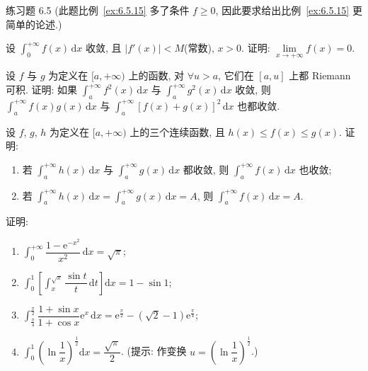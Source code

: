 \begin{exblock}{练习题 6.5}
  (此题比例~\ref{ex:6.5.15} 多了条件 $f\geqslant0$, 因此要求给出比例~\ref{ex:6.5.15} 更简单的论述.)

  \item 设 $\int_{0}^{+\infty}f(x)\,\mathrm{d}x$ 收敛, 且 $\left|f'(x)\right|<M$(常数), $x>0$. 证明: $\lim\limits_{x\to+\infty}f(x)=0$.

  \item 设 $f$ 与 $g$ 为定义在 $[a,+\infty)$ 上的函数, 对 $\forall u>a$, 它们在 $[a,u]$ 上都 Riemann 可积. 证明: 如果 $\int_{a}^{+\infty}f^{2}(x)\,\mathrm{d}x$ 与 $\int_{a}^{+\infty}g^{2}(x)\,\mathrm{d}x$ 收敛, 则 $\int_{a}^{+\infty}f(x)g(x)\,\mathrm{d}x$ 与 $\int_{a}^{+\infty}[f(x)+g(x)]^{2}\,\mathrm{d}x$ 也都收敛.

  \item 设 $f$, $g$, $h$ 为定义在 $[a,+\infty)$ 上的三个连续函数, 且 $h(x)\leqslant f(x)\leqslant g(x)$. 证明:
  \begin{enumerate}[label=(\arabic*)]
    \item 若 $\int_{a}^{+\infty}h(x)\,\mathrm{d}x$ 与 $\int_{a}^{+\infty}g(x)\,\mathrm{d}x$ 都收敛, 则 $\int_{a}^{+\infty}f(x)\,\mathrm{d}x$ 也收敛;
    \item 若 $\int_{a}^{+\infty}h(x)\,\mathrm{d}x=\int_{a}^{+\infty}g(x)\,\mathrm{d}x=A$, 则 $\int_{a}^{+\infty}f(x)\,\mathrm{d}x=A$.
  \end{enumerate}

  \item 证明:
  \begin{enumerate}[label=(\arabic*)]
    \item $\int_{0}^{+\infty}\dfrac{1-\mathrm{e}^{-x^{2}}}{x^{2}}\,\mathrm{d}x=\sqrt{\pi}$;
    \item $\int_{0}^{1}\left[\int_{x}^{\sqrt{x}}\dfrac{\sin t}{t}\,\mathrm{d}t\right]\mathrm{d}x=1-\sin1$;
    \item $\int_{\frac{\pi}{4}}^{\frac{\pi}{2}}\dfrac{1+\sin x}{1+\cos x}\mathrm{e}^{x}\,\mathrm{d}x=\mathrm{e}^{\frac{\pi}{2}}-(\sqrt{2}-1)\mathrm{e}^{\frac{\pi}{4}}$;
    \item $\int_{0}^{1}\left(\ln\dfrac{1}{x}\right)^{\frac{1}{2}}\mathrm{d}x=\dfrac{\sqrt{\pi}}{2}$. (提示: 作变换 $u=\left(\ln\dfrac{1}{x}\right)^{\frac{1}{2}}$.)
  \end{enumerate}

\end{exblock}

